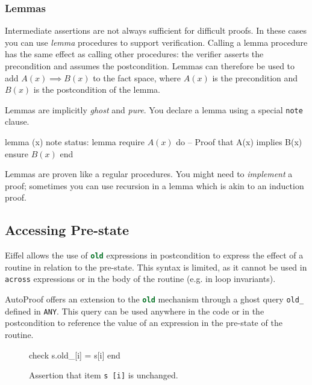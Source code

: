 \documentclass[a4paper,12pt]{article}
\newcommand{\AutoProof}{Auto\-Proof\xspace}
\newcommand{\e}[1]{\mbox{\lstinline[language=Eiffel]|#1|}}
\begin{document}
\subsubsection*{Lemmas}

Intermediate assertions are not always sufficient for difficult proofs. In these cases you can use \emph{lemma} procedures to support verification. Calling a lemma procedure has the same effect as calling other procedures: the verifier asserts the precondition and assumes the postcondition. Lemmas can therefore be used to add $A(x)\implies B(x)$ to the fact space, where $A(x)$ is the precondition and $B(x)$ is the postcondition of the lemma.

Lemmas are implicitly \emph{ghost} and \emph{pure}. You declare a lemma using a special \e{note} clause.
\begin{erunning}
lemma (x)
	note status: lemma
	require
		$A (x)$
	do
		-- Proof that A(x) implies B(x)
	ensure
		$B (x)$
	end
\end{erunning}

Lemmas are proven like a regular procedures. You might need to \emph{implement} a proof; sometimes you can use recursion in a lemma which is akin to an induction proof.

\subsection{Accessing Pre-state}

Eiffel allows the use of \e{old} expressions in postcondition to express the effect of a routine in relation to the pre-state. This syntax is limited, as it cannot be used in \e{across} expressions or in the body of the routine (e.g. in loop invariants).

\AutoProof offers an extension to the \e{old} mechanism through a ghost query \e{old_} defined in \e{ANY}. This query can be used anywhere in the code or in the postcondition to reference the value of an expression in the pre-state of the routine.

\begin{figure}
\begin{erunning}[numbers=none]
check s.old_[i] = s[i] end
\end{erunning}
\hspace{0.5cm}
\caption*{Assertion that item \e{s [i]} is unchanged.}
\end{figure}
\end{document}
